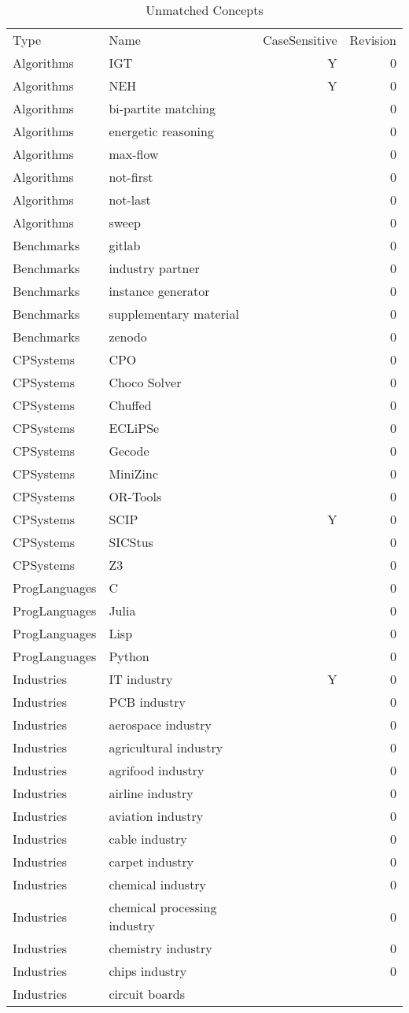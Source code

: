 {\scriptsize
\begin{longtable}{lp{10cm}rr}
\rowcolor{white}\caption{Unmatched Concepts}\\ \toprule
\rowcolor{white}Type & Name & CaseSensitive & Revision\\ \midrule
\endhead
\bottomrule
\endfoot
Algorithms & IGT & Y & 0\\Algorithms & NEH & Y & 0\\Algorithms & bi-partite matching &  & 0\\Algorithms & energetic reasoning &  & 0\\Algorithms & max-flow &  & 0\\Algorithms & not-first &  & 0\\Algorithms & not-last &  & 0\\Algorithms & sweep &  & 0\\Benchmarks & gitlab &  & 0\\Benchmarks & industry partner &  & 0\\Benchmarks & instance generator &  & 0\\Benchmarks & supplementary material &  & 0\\Benchmarks & zenodo &  & 0\\CPSystems & CPO &  & 0\\CPSystems & Choco Solver &  & 0\\CPSystems & Chuffed &  & 0\\CPSystems & ECLiPSe &  & 0\\CPSystems & Gecode &  & 0\\CPSystems & MiniZinc &  & 0\\CPSystems & OR-Tools &  & 0\\CPSystems & SCIP & Y & 0\\CPSystems & SICStus &  & 0\\CPSystems & Z3 &  & 0\\ProgLanguages & C  &  & 0\\ProgLanguages & Julia &  & 0\\ProgLanguages & Lisp &  & 0\\ProgLanguages & Python &  & 0\\Industries & IT industry & Y & 0\\Industries & PCB industry &  & 0\\Industries & aerospace industry &  & 0\\Industries & agricultural industry &  & 0\\Industries & agrifood industry &  & 0\\Industries & airline industry &  & 0\\Industries & aviation industry &  & 0\\Industries & cable industry &  & 0\\Industries & carpet industry &  & 0\\Industries & chemical industry &  & 0\\Industries & chemical processing industry &  & 0\\Industries & chemistry industry &  & 0\\Industries & chips industry &  & 0\\Industries & circuit boards 
\end{longtable}}
